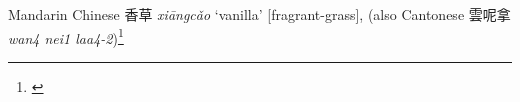 \begin{etymology}\label{ety:xiangcao}
Mandarin Chinese {香草} \textit{xiāngcǎo} `vanilla' [fragrant-grass], (also Cantonese 雲呢拿 \textit{wan4 nei1 laa4-2})\footnote{\textcite{mdbg}}
\end{etymology}